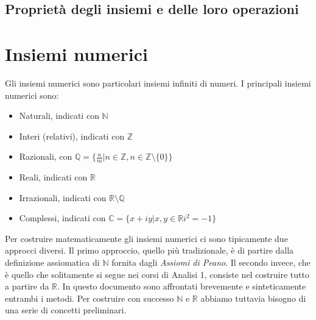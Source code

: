 \documentclass{article}
\begin{document}
\subsection{Proprietà degli insiemi e delle loro operazioni}

\section{Insiemi numerici}
Gli insiemi numerici sono particolari insiemi infiniti di numeri. I principali insiemi 
numerici sono:
\begin{itemize}[itemsep=0.05mm]
  \item Naturali, indicati con $\mathbb{N}$
  \item Interi (relativi), indicati con $\mathbb{Z}$
  \item Razionali, con $\mathbb{Q} = \{\frac{n}{m} | n \in  \mathbb{Z}, n \in \mathbb{Z} \setminus \{0\} \}$
  \item Reali, indicati con $\mathbb{R}$
  \item Irrazionali, indicati con $\mathbb{R} \setminus \mathbb{Q}$ 
  \item Complessi, indicati con $\mathbb{C} = \{x + iy | x, y \in \mathbb{R} i^2 = -1\}$ 
\end{itemize}
Per costruire matematicamente gli insiemi numerici ci sono tipicamente due approcci diversi.
Il primo approccio, quello più tradizionale, è di partire dalla definizione assiomatica 
di $\mathbb{N}$ fornita dagli \textit{Assiomi di Peano}. Il secondo invece, che è quello
che solitamente si segue nei corsi di Analisi 1, consiste nel costruire tutto a partire
 da  $\mathbb{R}$. In questo documento sono affrontati brevemente e sinteticamente
 entrambi i metodi. Per costruire con successo $\mathbb{N}$ e  $\mathbb{R}$ abbiamo
 tuttavia bisogno di una serie di concetti preliminari.

\end{document}
